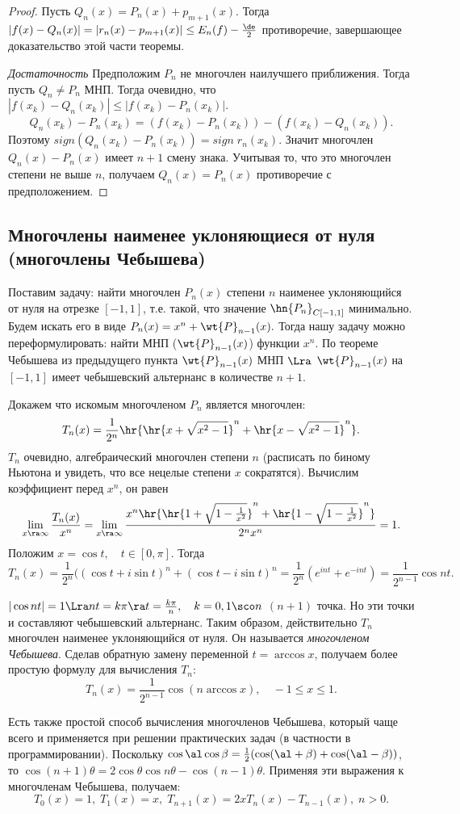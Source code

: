 \documentclass[a4paper]{article}
\begin{document}
\begin{proof}
  Пусть $Q_n(x)=P_n(x)+p_{m+1}(x)$. Тогда
  $|f(x)-Q_n(x)|=|r_n(x)-p_{m+1}(x)|\le E_n(f)-\frac{\de}2$ противоречие, завершающее доказательство этой части теоремы.

  \emph{Достаточность} Предположим $P_n$ не многочлен наилучшего
  приближения. Тогда пусть $Q_n\neq P_n$ МНП. Тогда очевидно, что
  $|f(x_k)-Q_n(x_k)|\le|f(x_k)-P_n(x_k)|.$
  $$Q_n(x_k)-P_n(x_k)=(f(x_k)-P_n(x_k))-(f(x_k)-Q_n(x_k)).$$
  Поэтому $sign(Q_n(x_k)-P_n(x_k))=sign\; r_n(x_k)$. Значит
  многочлен $Q_n(x)-P_n(x)$ имеет $n+1$ смену знака. Учитывая то,
  что это многочлен степени не выше $n$, получаем $Q_n(x)=P_n(x)$ противоречие с предположением.
\end{proof}

\subsection{Многочлены наименее уклоняющиеся от нуля (многочлены Чебышева)}
Поставим задачу: найти многочлен $P_n(x)$ степени $n$ наименее
уклоняющийся от нуля на отрезке $[-1,1]$, т.е. такой, что значение
$\hn{P_n}_{C[-1,1]}$ минимально. Будем искать его в виде
$P_n(x)=x^n+\wt{P}_{n-1}(x).$ Тогда нашу задачу можно
переформулировать: найти МНП ($\wt{P}_{n-1}(x)$) функции
$x^n$. По теореме Чебышева из предыдущего пункта
$\wt{P}_{n-1}(x)$ МНП $\Lra$
$\wt{P}_{n-1}(x)$ на $[-1,1]$ имеет чебышевский альтернанс
в количестве $n+1$.

Докажем что искомым многочленом $P_n$ является многочлен:
$$T_n(x)=\frac1{2^n}\hr{\hr{x+\sqrt{x^2-1}}^n+\hr{x-\sqrt{x^2-1}}^n}.$$
$T_n$ очевидно, алгебраический многочлен степени $n$ (расписать
по биному Ньютона и увидеть, что все нецелые степени $x$
сократятся). Вычислим коэффициент перед $x^n$, он равен
$$\lim_{x\ra\infty}\frac{T_n(x)}{x^n}=\lim_{x\ra\infty}\frac{x^n\hr{\hr{1+\sqrt{1-\frac1{x^2}}}^n+\hr{1-\sqrt{1-\frac1{x^2}}}^n}}{2^nx^n}=1.$$
Положим $x=\cos t,\quad t\in[0,\pi]$. Тогда
$$T_n(x)=\frac1{2^n}((\cos t+i\sin t)^n+(\cos t-i\sin
t)^n=\frac1{2^n}(e^{int}+e^{-int})=\frac1{2^{n-1}}\cos nt.$$

$|\cos nt|=1\Lra nt=k\pi\ra t=\frac{k\pi}n,\quad k=0,1\sco n$ $(n+1)$ точка. Но эти
точки и составляют чебышевский альтернанс. Таким образом, действительно $T_n$ многочлен наименее
уклоняющийся от нуля. Он называется \emph{многочленом Чебышева}. Сделав обратную замену переменной $t=\arccos
x$, получаем более простую формулу для вычисления $T_n$:
$$T_n(x)=\frac1{2^{n-1}}\cos(n\arccos x),\quad -1\le x\le1.$$

Есть также простой способ вычисления многочленов Чебышева, который
чаще всего и применяется при решении практических задач (в
частности в программировании). Поскольку
$\cos\al\cos\beta=\frac12(\cos(\al+\beta)+\cos(\al-\beta))$,
то $\cos(n+1)\theta=2\cos\theta\cos n\theta-\cos(n-1)\theta.$
Применяя эти выражения к многочленам Чебышева, получаем:
$$T_0(x)=1,\;T_1(x)=x,\;T_{n+1}(x)=2xT_n(x)-T_{n-1}(x),\;n>0.$$
\end{document}
